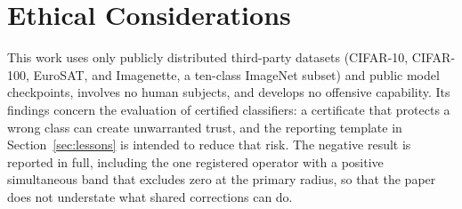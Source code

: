 \section*{Ethical Considerations}

This work uses only publicly distributed third-party datasets (CIFAR-10,
CIFAR-100, EuroSAT, and Imagenette, a ten-class ImageNet subset) and public
model checkpoints, involves no human subjects, and develops no offensive
capability. Its findings concern the evaluation of certified classifiers: a
certificate that protects a wrong class can create unwarranted trust, and the
reporting template in Section~\ref{sec:lessons} is intended to reduce that
risk. The negative result is reported in full, including the one registered
operator with a positive simultaneous band that excludes zero at the primary
radius, so that the paper does not understate what shared corrections can do.
